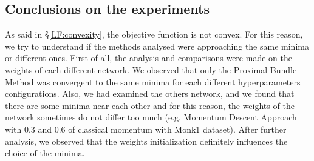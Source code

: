 \subsection{Conclusions on the experiments}
As said in \S\ref{LF:convexity}, the objective function is not convex. For this reason, we try to understand if the methods analysed were approaching the same minima or different ones. First of all, the analysis and comparisons were made on the weights of each different network. We observed that only the Proximal Bundle Method was convergent to the same minima for each different hyperparameters configurations. Also, we had examined the others network, and we found that there are some minima near each other and for this reason, the weights of the network sometimes do not differ too much (e.g. Momentum Descent Approach with 0.3 and 0.6 of classical momentum with Monk1 dataset). After further analysis, we observed that the weights initialization definitely influences the choice of the minima.